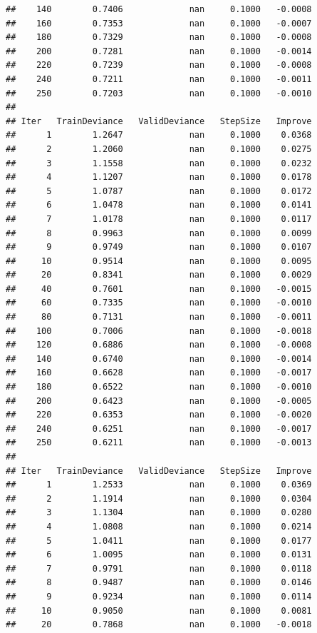 \documentclass[
]{book}
\begin{document}
\begin{verbatim}
##    140        0.7406             nan     0.1000   -0.0008
##    160        0.7353             nan     0.1000   -0.0007
##    180        0.7329             nan     0.1000   -0.0008
##    200        0.7281             nan     0.1000   -0.0014
##    220        0.7239             nan     0.1000   -0.0008
##    240        0.7211             nan     0.1000   -0.0011
##    250        0.7203             nan     0.1000   -0.0010
## 
## Iter   TrainDeviance   ValidDeviance   StepSize   Improve
##      1        1.2647             nan     0.1000    0.0368
##      2        1.2060             nan     0.1000    0.0275
##      3        1.1558             nan     0.1000    0.0232
##      4        1.1207             nan     0.1000    0.0178
##      5        1.0787             nan     0.1000    0.0172
##      6        1.0478             nan     0.1000    0.0141
##      7        1.0178             nan     0.1000    0.0117
##      8        0.9963             nan     0.1000    0.0099
##      9        0.9749             nan     0.1000    0.0107
##     10        0.9514             nan     0.1000    0.0095
##     20        0.8341             nan     0.1000    0.0029
##     40        0.7601             nan     0.1000   -0.0015
##     60        0.7335             nan     0.1000   -0.0010
##     80        0.7131             nan     0.1000   -0.0011
##    100        0.7006             nan     0.1000   -0.0018
##    120        0.6886             nan     0.1000   -0.0008
##    140        0.6740             nan     0.1000   -0.0014
##    160        0.6628             nan     0.1000   -0.0017
##    180        0.6522             nan     0.1000   -0.0010
##    200        0.6423             nan     0.1000   -0.0005
##    220        0.6353             nan     0.1000   -0.0020
##    240        0.6251             nan     0.1000   -0.0017
##    250        0.6211             nan     0.1000   -0.0013
## 
## Iter   TrainDeviance   ValidDeviance   StepSize   Improve
##      1        1.2533             nan     0.1000    0.0369
##      2        1.1914             nan     0.1000    0.0304
##      3        1.1304             nan     0.1000    0.0280
##      4        1.0808             nan     0.1000    0.0214
##      5        1.0411             nan     0.1000    0.0177
##      6        1.0095             nan     0.1000    0.0131
##      7        0.9791             nan     0.1000    0.0118
##      8        0.9487             nan     0.1000    0.0146
##      9        0.9234             nan     0.1000    0.0114
##     10        0.9050             nan     0.1000    0.0081
##     20        0.7868             nan     0.1000   -0.0018

\end{verbatim}
\end{document}
